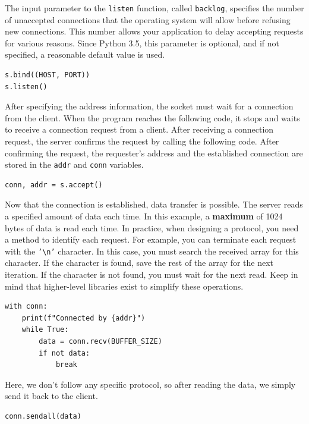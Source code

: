 \documentclass[]{article}
\begin{document}
  The input parameter to the \texttt{listen} function, called \texttt{backlog}, specifies the number of unaccepted connections that the operating system will allow before refusing new connections.
  This number allows your application to delay accepting requests for various reasons.
  Since Python 3.5, this parameter is optional, and if not specified, a reasonable default value is used.

  \begin{verbatim}
s.bind((HOST, PORT))
s.listen()
  \end{verbatim}

  After specifying the address information, the socket must wait for a connection from the client.
  When the program reaches the following code, it stops and waits to receive a connection request from a client.
  After receiving a connection request, the server confirms the request by calling the following code.
  After confirming the request, the requester's address and the established connection are stored in the \texttt{addr} and \texttt{conn} variables.

  \begin{verbatim}
conn, addr = s.accept()
  \end{verbatim}

  Now that the connection is established, data transfer is possible.
  The server reads a specified amount of data each time. In this example, a \textbf{maximum} of 1024 bytes of data is read each time.
  In practice, when designing a protocol, you need a method to identify each request. For example, you can terminate each request with the \texttt{'\textbackslash n'} character.
  In this case, you must search the received array for this character. If the character is found, save the rest of the array for the next iteration.
  If the character is not found, you must wait for the next read. Keep in mind that higher-level libraries exist to simplify these operations.

  \begin{verbatim}
with conn:
    print(f"Connected by {addr}")
    while True:
        data = conn.recv(BUFFER_SIZE)
        if not data:
            break
  \end{verbatim}

  Here, we don't follow any specific protocol, so after reading the data, we simply send it back to the client.

  \begin{verbatim}
conn.sendall(data)
  \end{verbatim}
\end{document}

